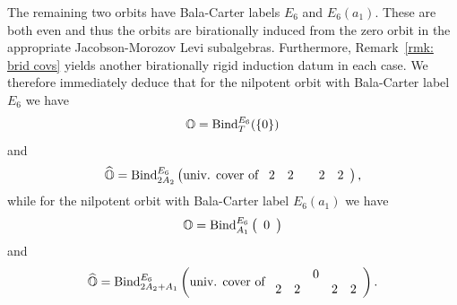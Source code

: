 \documentclass[11pt]{amsart}
\renewcommand{\O}{{\mathbb O}}
\newcommand{\BInd}{{{\mbox{\rm Bind}}}}
\newcommand{\hatO}{\widehat{\O}}
\numberwithin{equation}{section}
\begin{document}
	The remaining two orbits have Bala-Carter labels $E_6$ and $E_6(a_1)$. These are both even and thus the orbits are birationally induced from the zero orbit in the appropriate Jacobson-Morozov Levi subalgebras. Furthermore, Remark~\ref{rmk: brid covs} yields another birationally rigid induction datum in each case. We therefore immediately deduce that for the nilpotent orbit with Bala-Carter label $E_6$ we have $$\O=\BInd_{T}^{E_6}(\{0\})$$ and $$\hatO=\BInd_{2 A_2}^{E_6}\left(\mbox{univ. cover of } \begin{array}{c c c c c }
		2 & 2 &  & 2 & 2 \\
	\end{array}\right),$$ while for the nilpotent orbit with Bala-Carter label $E_6(a_1)$ we have $$\O=\BInd_{A_1}^{E_6}\left(\begin{array}{c}
		0\end{array}\right)$$ and $$\hatO=\BInd_{2 A_2 + A_1}^{E_6}\left(\mbox{univ. cover of } \begin{array}{c c c c c }
		& & 0 & & \\
		2 & 2 &  & 2 & 2 \\
	\end{array}\right).$$
	
	

	
\end{document}
